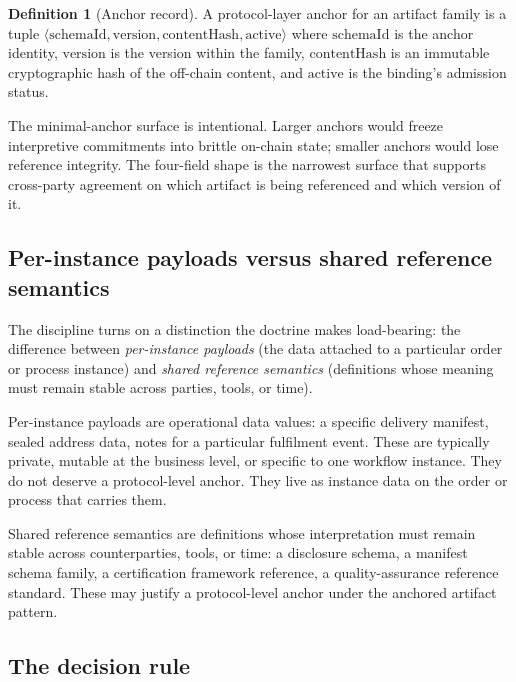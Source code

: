 \documentclass[11pt,a4paper]{article}
\theoremstyle{definition}
\newtheorem{definition}[theorem]{Definition}
\theoremstyle{remark}
\newcommand{\schemaid}{\mathrm{schemaId}}
\begin{document}
\begin{definition}[Anchor record]
\label{def:anchor}
A protocol-layer anchor for an artifact family is a tuple
$\langle \schemaid, \mathrm{version}, \mathrm{contentHash},
\mathrm{active} \rangle$ where $\schemaid$ is the anchor identity,
$\mathrm{version}$ is the version within the family,
$\mathrm{contentHash}$ is an immutable cryptographic hash of the
off-chain content, and $\mathrm{active}$ is the binding's admission
status.
\end{definition}

The minimal-anchor surface is intentional. Larger anchors would
freeze interpretive commitments into brittle on-chain state; smaller
anchors would lose reference integrity. The four-field shape is the
narrowest surface that supports cross-party agreement on which
artifact is being referenced and which version of it.

\subsection{Per-instance payloads versus shared reference semantics}

The discipline turns on a distinction the doctrine makes load-bearing:
the difference between \emph{per-instance payloads} (the data
attached to a particular order or process instance) and \emph{shared
reference semantics} (definitions whose meaning must remain stable
across parties, tools, or time).

Per-instance payloads are operational data values: a specific
delivery manifest, sealed address data, notes for a particular
fulfilment event. These are typically private, mutable at the
business level, or specific to one workflow instance. They do not
deserve a protocol-level anchor. They live as instance data on the
order or process that carries them.

Shared reference semantics are definitions whose interpretation must
remain stable across counterparties, tools, or time: a disclosure
schema, a manifest schema family, a certification framework
reference, a quality-assurance reference standard. These may justify
a protocol-level anchor under the anchored artifact pattern.

\subsection{The decision rule}
\end{document}
